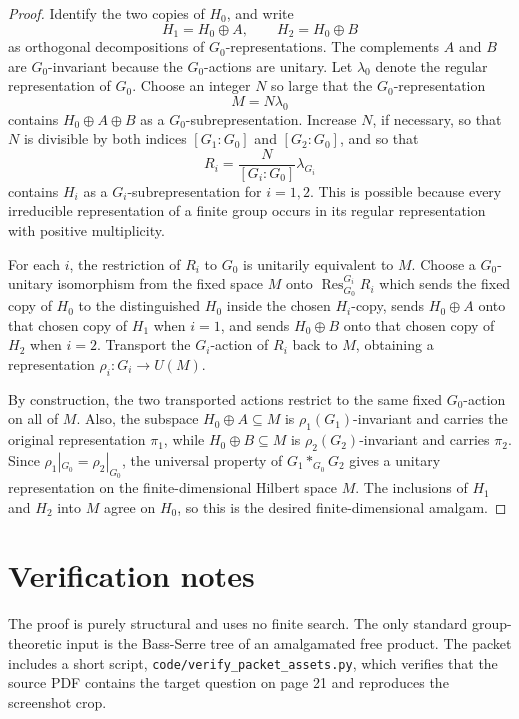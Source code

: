 \documentclass[11pt]{article}
\begin{document}
\begin{proof}
Identify the two copies of \(H_0\), and write
\[
H_1=H_0\oplus A,\qquad H_2=H_0\oplus B
\]
as orthogonal decompositions of \(G_0\)-representations.  The complements
\(A\) and \(B\) are \(G_0\)-invariant because the \(G_0\)-actions are unitary.
Let \(\lambda_0\) denote the regular representation of \(G_0\).  Choose an
integer \(N\) so large that the \(G_0\)-representation
\[
M=N\lambda_0
\]
contains \(H_0\oplus A\oplus B\) as a \(G_0\)-subrepresentation.  Increase
\(N\), if necessary, so that \(N\) is divisible by both indices
\([G_1:G_0]\) and \([G_2:G_0]\), and so that
\[
R_i=\frac{N}{[G_i:G_0]}\lambda_{G_i}
\]
contains \(H_i\) as a \(G_i\)-subrepresentation for \(i=1,2\).  This is
possible because every irreducible representation of a finite group occurs in
its regular representation with positive multiplicity.

For each \(i\), the restriction of \(R_i\) to \(G_0\) is unitarily equivalent
to \(M\).  Choose a \(G_0\)-unitary isomorphism from the fixed space \(M\) onto
\(\operatorname{Res}^{G_i}_{G_0}R_i\) which sends the fixed copy of \(H_0\) to
the distinguished \(H_0\) inside the chosen \(H_i\)-copy, sends
\(H_0\oplus A\) onto that chosen copy of \(H_1\) when \(i=1\), and sends
\(H_0\oplus B\) onto that chosen copy of \(H_2\) when \(i=2\).  Transport the
\(G_i\)-action of \(R_i\) back to \(M\), obtaining a representation
\(\rho_i\colon G_i\to U(M)\).

By construction, the two transported actions restrict to the same fixed
\(G_0\)-action on all of \(M\).  Also, the subspace \(H_0\oplus A\subseteq M\)
is \(\rho_1(G_1)\)-invariant and carries the original representation
\(\pi_1\), while \(H_0\oplus B\subseteq M\) is \(\rho_2(G_2)\)-invariant and
carries \(\pi_2\).  Since \(\rho_1|_{G_0}=\rho_2|_{G_0}\), the universal
property of \(G_1*_{G_0}G_2\) gives a unitary representation on the
finite-dimensional Hilbert space \(M\).  The inclusions of \(H_1\) and \(H_2\)
into \(M\) agree on \(H_0\), so this is the desired finite-dimensional
amalgam.
\end{proof}

\section*{Verification notes}

The proof is purely structural and uses no finite search.  The only standard
group-theoretic input is the Bass-Serre tree of an amalgamated free product.
The packet includes a short script, \texttt{code/verify\_packet\_assets.py},
which verifies that the source PDF contains the target question on page 21 and
reproduces the screenshot crop.
\end{document}
